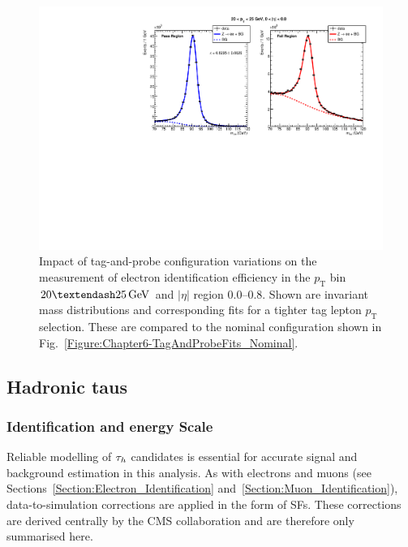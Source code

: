 \begin{figure}[!htbp]
    \centering
    \includegraphics[width=\textwidth]{Figures/Chapter6/data_id_pt_20_to_25_eta_0.0_to_0.8_tpzee_tightTag.pdf}
    \caption[Impact of tag-and-probe configuration variations on efficiency extraction.]{Impact of tag-and-probe configuration variations on the measurement of electron identification efficiency in the $p_{\mathrm{T}}$ bin $20–25\GeV$ and $|\eta|$ region 0.0–0.8. Shown are invariant mass distributions and corresponding fits for a tighter tag lepton $p_\text{T}$ selection. These are compared to the nominal configuration shown in Fig.~\ref{Figure:Chapter6-TagAndProbeFits_Nominal}.}
    \label{Figure:Chapter6-TagAndProbeFits_Alternative}
\end{figure}

\subsection{Hadronic taus}

\subsubsection{Identification and energy Scale}
\label{Section:Chapter6_Tau_ID_ES}

Reliable modelling of $\tau_h$ candidates is essential for accurate signal and background estimation in this analysis. As with electrons and muons (see Sections~\ref{Section:Electron_Identification} and~\ref{Section:Muon_Identification}), data-to-simulation corrections are applied in the form of SFs. These corrections are derived centrally by the \ac{CMS} collaboration and are therefore only summarised here.

